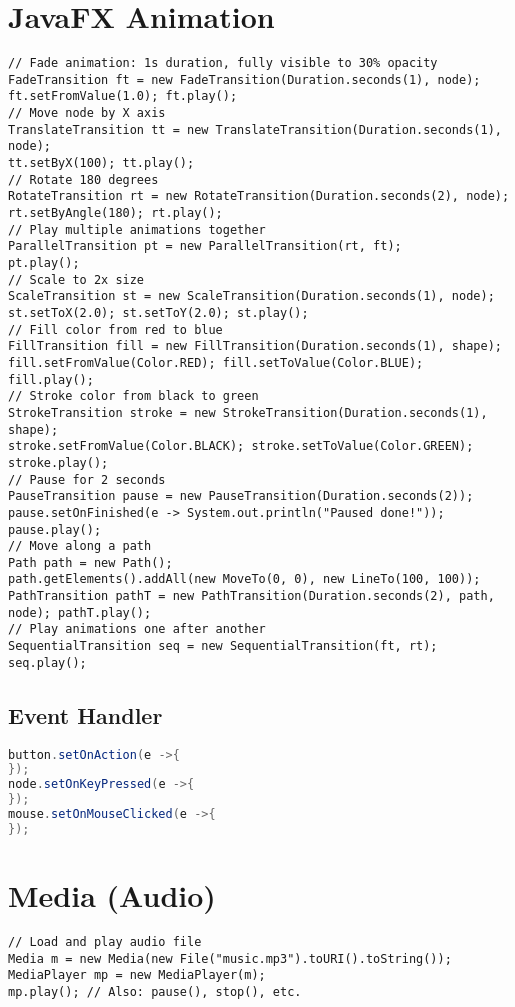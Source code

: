 \documentclass[10pt]{article}
\begin{document}
\begin{multicols}{2}
\section*{JavaFX Animation}
\begin{lstlisting}
// Fade animation: 1s duration, fully visible to 30% opacity
FadeTransition ft = new FadeTransition(Duration.seconds(1), node);
ft.setFromValue(1.0); ft.play();
// Move node by X axis
TranslateTransition tt = new TranslateTransition(Duration.seconds(1), node);
tt.setByX(100); tt.play();
// Rotate 180 degrees
RotateTransition rt = new RotateTransition(Duration.seconds(2), node);
rt.setByAngle(180); rt.play();
// Play multiple animations together
ParallelTransition pt = new ParallelTransition(rt, ft);
pt.play();
// Scale to 2x size
ScaleTransition st = new ScaleTransition(Duration.seconds(1), node);
st.setToX(2.0); st.setToY(2.0); st.play();
// Fill color from red to blue
FillTransition fill = new FillTransition(Duration.seconds(1), shape);
fill.setFromValue(Color.RED); fill.setToValue(Color.BLUE); fill.play();
// Stroke color from black to green
StrokeTransition stroke = new StrokeTransition(Duration.seconds(1), shape);
stroke.setFromValue(Color.BLACK); stroke.setToValue(Color.GREEN); stroke.play();
// Pause for 2 seconds
PauseTransition pause = new PauseTransition(Duration.seconds(2));
pause.setOnFinished(e -> System.out.println("Paused done!")); pause.play();
// Move along a path
Path path = new Path();
path.getElements().addAll(new MoveTo(0, 0), new LineTo(100, 100));
PathTransition pathT = new PathTransition(Duration.seconds(2), path, node); pathT.play();
// Play animations one after another
SequentialTransition seq = new SequentialTransition(ft, rt); 
seq.play();
\end{lstlisting}

\subsection*{Event Handler}
\begin{lstlisting}[language=java]
button.setOnAction(e ->{
});
node.setOnKeyPressed(e ->{
});
mouse.setOnMouseClicked(e ->{
});
\end{lstlisting}

\section*{Media (Audio)}
\begin{lstlisting}
// Load and play audio file
Media m = new Media(new File("music.mp3").toURI().toString());
MediaPlayer mp = new MediaPlayer(m);
mp.play(); // Also: pause(), stop(), etc.
\end{lstlisting}


\end{multicols}
\end{document}
